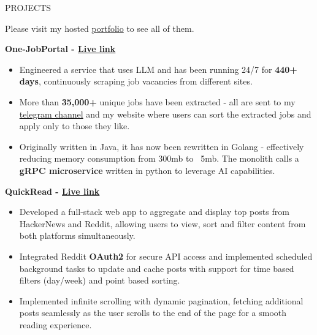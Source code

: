 \documentclass{resume} %
\begin{document}
\begin{rSection}{PROJECTS }
\vspace{-1.25em}
\item Please visit my hosted \href{https://home.alles-tools.com/projects}{portfolio} to see all of them.

\item \textbf{One-JobPortal - \href{https://jobs.alles-tools.com}{Live link}} {
\begin{itemize}
    \item Engineered a service that uses LLM and has been running 24/7 for \textbf{440+ days}, continuously scraping job vacancies from different sites. 
    \item More than \textbf{35,000+} unique jobs have been extracted - all are sent to my \href{https://t.me/FresherJobsGetHired}{telegram channel} and my website where users can sort the extracted jobs and apply only to those they like.
    \item Originally written in Java, it has now been rewritten in Golang - effectively reducing memory consumption from 300mb to ~5mb. The monolith calls a \textbf{gRPC microservice} written in python to leverage AI capabilities.
\end{itemize}
}

\item \textbf{QuickRead - \href{https://quickread.alles-tools.com}{Live link}} {
\begin{itemize}
    \item Developed a full-stack web app to aggregate and display top posts from HackerNews and Reddit, allowing users to view, sort and filter content from both platforms simultaneously.  
    \item Integrated Reddit \textbf{OAuth2} for secure API access and implemented scheduled background tasks to update and cache posts with support for time based filters (day/week) and point based sorting.
    \item Implemented infinite scrolling with dynamic pagination, fetching additional posts seamlessly as the user scrolls to the end of the page for a smooth reading experience. 
\end{itemize}
}



\end{rSection}
\end{document}
